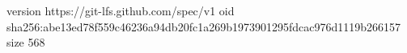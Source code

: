 version https://git-lfs.github.com/spec/v1
oid sha256:abe13ed78f559c46236a94db20fc1a269b1973901295fdcac976d1119b266157
size 568
